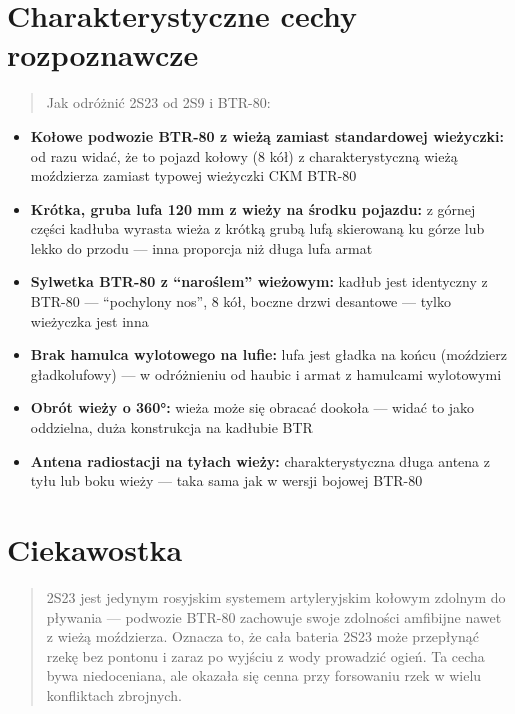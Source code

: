 \documentclass[12pt,openany,oneside]{book}
\providecommand{\tightlist}{%
  \setlength{\itemsep}{0pt}\setlength{\parskip}{0pt}}
\begin{document}
\section{Charakterystyczne cechy
rozpoznawcze}\label{charakterystyczne-cechy-rozpoznawcze-13}

\begin{quote}
Jak odróżnić 2S23 od 2S9 i BTR-80:
\end{quote}

\begin{itemize}
\tightlist
\item
  \textbf{Kołowe podwozie BTR-80 z wieżą zamiast standardowej
  wieżyczki:} od razu widać, że to pojazd kołowy (8 kół) z
  charakterystyczną wieżą moździerza zamiast typowej wieżyczki CKM
  BTR-80
\item
  \textbf{Krótka, gruba lufa 120 mm z wieży na środku pojazdu:} z górnej
  części kadłuba wyrasta wieża z krótką grubą lufą skierowaną ku górze
  lub lekko do przodu --- inna proporcja niż długa lufa armat
\item
  \textbf{Sylwetka BTR-80 z ``naroślem'' wieżowym:} kadłub jest
  identyczny z BTR-80 --- ``pochylony nos'', 8 kół, boczne drzwi
  desantowe --- tylko wieżyczka jest inna
\item
  \textbf{Brak hamulca wylotowego na lufie:} lufa jest gładka na końcu
  (moździerz gładkolufowy) --- w odróżnieniu od haubic i armat z
  hamulcami wylotowymi
\item
  \textbf{Obrót wieży o 360°:} wieża może się obracać dookoła --- widać
  to jako oddzielna, duża konstrukcja na kadłubie BTR
\item
  \textbf{Antena radiostacji na tyłach wieży:} charakterystyczna długa
  antena z tyłu lub boku wieży --- taka sama jak w wersji bojowej BTR-80
\end{itemize}

\section{Ciekawostka}\label{ciekawostka-13}

\begin{quote}
2S23 jest jedynym rosyjskim systemem artyleryjskim kołowym zdolnym do
pływania --- podwozie BTR-80 zachowuje swoje zdolności amfibijne nawet z
wieżą moździerza. Oznacza to, że cała bateria 2S23 może przepłynąć rzekę
bez pontonu i zaraz po wyjściu z wody prowadzić ogień. Ta cecha bywa
niedoceniana, ale okazała się cenna przy forsowaniu rzek w wielu
konfliktach zbrojnych.
\end{quote}
\end{document}

